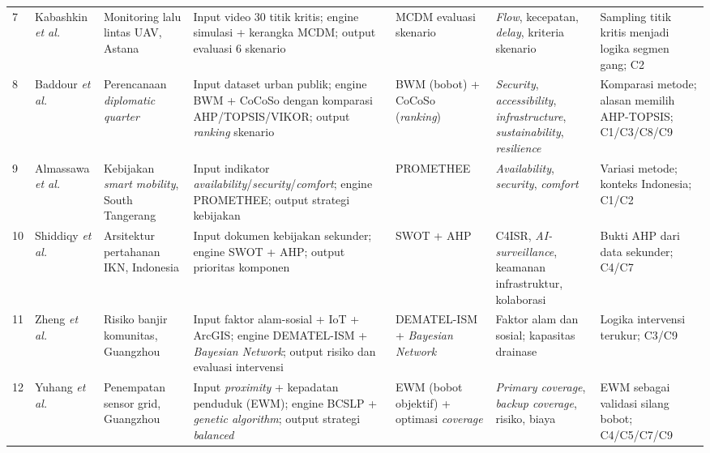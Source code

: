 \documentclass[10pt,twocolumn,a4paper]{article}
\begin{document}
\begin{table}[!t]
\begin{tabular}{@{}P{0.35cm}P{1.45cm}P{2.1cm}P{4.2cm}P{2.3cm}P{2.6cm}P{2.7cm}@{}}
7 & Kabashkin \textit{et al.} \cite{kab} & Monitoring lalu lintas UAV, Astana & Input video 30 titik kritis; engine simulasi + kerangka MCDM; output evaluasi 6 skenario & MCDM evaluasi skenario & \textit{Flow}, kecepatan, \textit{delay}, kriteria skenario & Sampling titik kritis menjadi logika segmen gang; C2 \\
8 & Baddour \textit{et al.} \cite{baddour} & Perencanaan \textit{diplomatic quarter} & Input dataset urban publik; engine BWM + CoCoSo dengan komparasi AHP/TOPSIS/VIKOR; output \textit{ranking} skenario & BWM (bobot) + CoCoSo (\textit{ranking}) & \textit{Security}, \textit{accessibility}, \textit{infrastructure}, \textit{sustainability}, \textit{resilience} & Komparasi metode; alasan memilih AHP-TOPSIS; C1/C3/C8/C9 \\
9 & Almassawa \textit{et al.} \cite{alma} & Kebijakan \textit{smart mobility}, South Tangerang & Input indikator \textit{availability}/\textit{security}/\textit{comfort}; engine PROMETHEE; output strategi kebijakan & PROMETHEE & \textit{Availability}, \textit{security}, \textit{comfort} & Variasi metode; konteks Indonesia; C1/C2 \\
10 & Shiddiqy \textit{et al.} \cite{shid} & Arsitektur pertahanan IKN, Indonesia & Input dokumen kebijakan sekunder; engine SWOT + AHP; output prioritas komponen & SWOT + AHP & C4ISR, \textit{AI-surveillance}, keamanan infrastruktur, kolaborasi & Bukti AHP dari data sekunder; C4/C7 \\
11 & Zheng \textit{et al.} \cite{zheng} & Risiko banjir komunitas, Guangzhou & Input faktor alam-sosial + IoT + ArcGIS; engine DEMATEL-ISM + \textit{Bayesian Network}; output risiko dan evaluasi intervensi & DEMATEL-ISM + \textit{Bayesian Network} & Faktor alam dan sosial; kapasitas drainase & Logika intervensi terukur; C3/C9 \\
12 & Yuhang \textit{et al.} \cite{yuhang} & Penempatan sensor grid, Guangzhou & Input \textit{proximity} + kepadatan penduduk (EWM); engine BCSLP + \textit{genetic algorithm}; output strategi \textit{balanced} & EWM (bobot objektif) + optimasi \textit{coverage} & \textit{Primary coverage}, \textit{backup coverage}, risiko, biaya & EWM sebagai validasi silang bobot; C4/C5/C7/C9 \\
\bottomrule
\end{tabular}
\end{table}
\end{document}
